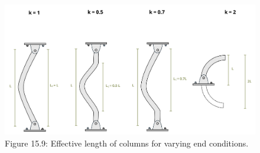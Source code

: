 \documentclass[
  letterpaper,
  DIV=11,
  numbers=noendperiod]{scrreprt}
\theoremstyle{definition}
\theoremstyle{remark}
\begin{document}
\begin{figure}[H]

{\centering \includegraphics{images/CH15s PNGs/figure 15.9.png}

}

\caption{Figure 15.9: Effective length of columns for varying end
conditions.}

\end{figure}%
\end{document}
